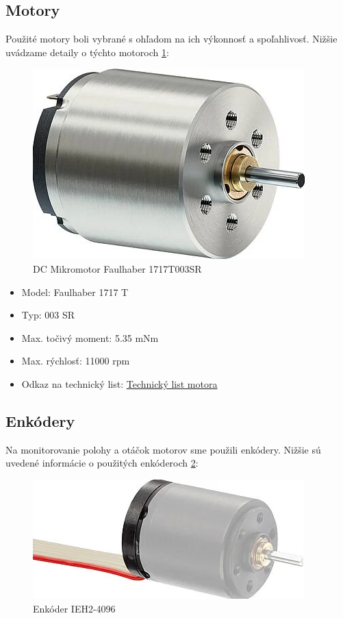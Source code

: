 \subsection{Motory}
Použité motory boli vybrané s ohľadom na ich výkonnosť a spoľahlivosť. Nižšie uvádzame detaily o týchto motoroch \ref{fig:motor}:

\begin{figure}[!htbp]
        \centering
        \includegraphics[scale=0.8]{includes/images/faulhaber.png}
        \caption{DC Mikromotor Faulhaber 1717T003SR}
        \label{fig:motor}
\end{figure}

\begin{itemize}
  \item Model: Faulhaber 1717 T 
  \item Typ: 003 SR
  \item Max. točivý moment: 5.35 mNm
  \item Max. rýchlosť: 11000 rpm
  \item Odkaz na technický list: \href{https://www.faulhaber.com/fileadmin/Import/Media/EN_1717_SR_DFF.pdf}{Technický list motora}
\end{itemize}

\subsection{Enkódery}
Na monitorovanie polohy a otáčok motorov sme použili enkódery. Nižšie sú uvedené informácie o použitých enkóderoch \ref{fig:encoder}:

\begin{figure}[!htbp]
        \centering
        \includegraphics[scale=0.8]{includes/images/encoder.png}
        \caption{Enkóder IEH2-4096}
        \label{fig:encoder}
\end{figure}


